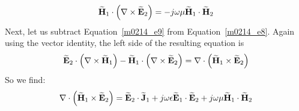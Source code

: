 \begin{equation}
\widetilde{\bf H}_1 \cdot \left( \nabla \times  \widetilde{\bf E}_2 \right) = -j\omega\mu\widetilde{\bf H}_1 \cdot \widetilde{\bf H}_2 
\label{m0214_e9}
\end{equation}
%
Next, let us subtract Equation~\ref{m0214_e9} from Equation~\ref{m0214_e8}. 
Again using the vector identity, the left side of the resulting equation is 
%
\begin{equation}
\widetilde{\bf E}_2 \cdot \left( \nabla \times  \widetilde{\bf H}_1 \right) - \widetilde{\bf H}_1 \cdot \left( \nabla \times  \widetilde{\bf E}_2 \right) = \nabla \cdot \left(\widetilde{\bf H}_1 \times \widetilde{\bf E}_2 \right)
\end{equation}
%
So we find:
%
\begin{equation}
\nabla \cdot \left(\widetilde{\bf H}_1 \times \widetilde{\bf E}_2 \right)
= \widetilde{\bf E}_2 \cdot \widetilde{\bf J}_1 
+j\omega\epsilon\widetilde{\bf E}_1 \cdot \widetilde{\bf E}_2 
+j\omega\mu     \widetilde{\bf H}_1 \cdot \widetilde{\bf H}_2
\label{m0214_e10}
\end{equation}

